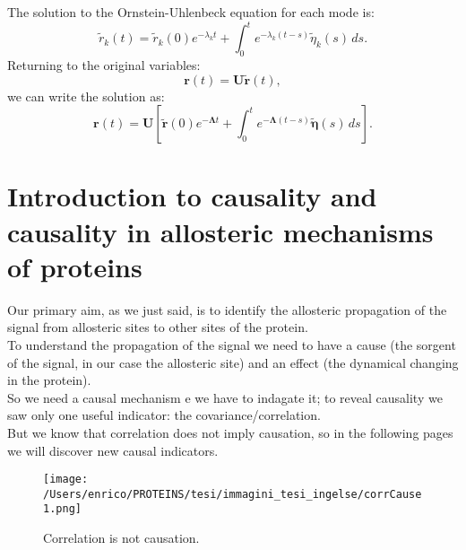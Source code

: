 \documentclass[English, Lau, oneside]{sapthesis}
\begin{document}
The solution to the Ornstein-Uhlenbeck equation for each mode is:
\[
\tilde{r}_k(t) = \tilde{r}_k(0) e^{-\lambda_k t} + \int_0^t e^{-\lambda_k (t-s)} \tilde{\eta}_k(s) \, ds.
\]
Returning to the original variables:
\[
\mathbf{r}(t) = \mathbf{U} \tilde{\mathbf{r}}(t),
\]
we can write the solution as:
\[
\mathbf{r}(t) = \mathbf{U} \left[ \tilde{\mathbf{r}}(0) e^{-\boldsymbol{\Lambda} t} + \int_0^t e^{-\boldsymbol{\Lambda} (t-s)} \tilde{\boldsymbol{\eta}}(s) \, ds \right].
\]










































\newpage
\chapter{Introduction to causality and causality in allosteric mechanisms of proteins}
\noindent Our primary aim, as we just said, is to identify  the allosteric propagation of the signal from allosteric sites to other sites of the protein.\\
To understand the propagation of the signal we need to have a cause (the sorgent of the signal, in our case the allosteric site) and an effect (the dynamical changing in the protein).\\
So we need a causal mechanism e we have to indagate it; to reveal causality we saw only one useful indicator: the covariance/correlation.\\
But we know that correlation does not imply causation, so in the following pages we will discover new causal indicators.

\begin{figure}[h]
    \centering
    \texttt{[image: /Users/enrico/PROTEINS/tesi/immagini\_tesi\_ingelse/corrCause1.png]}    
    \caption{Correlation is not causation.}
    \label{fig:Correlation is not causation}
\end{figure}
\end{document}
